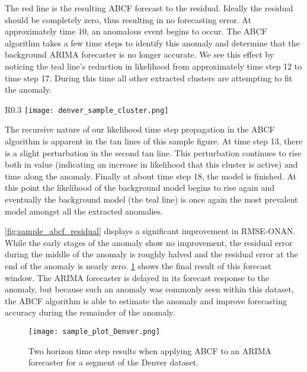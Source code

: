 The red line is the resulting ABCF forecast to the residual.  Ideally the residual should be completely zero, thus resulting in no forecasting error.  At approximately time 10, an anomalous event begins to occur.  The ABCF algorithm takes a few time steps to identify this anomaly and determine that the background ARIMA forecaster is no longer accurate.  We see this effect by noticing the teal line's reduction in likelihood from approximately time step 12 to time step 17.  During this time all other extracted clusters are attempting to fit the anomaly.

\begin{wrapfigure}{R}{0.3\textwidth}
\centering
\texttt{[image: denver\_sample\_cluster.png]}
\caption{Extracted sample clustered anomaly.}
\label{fig:sample_cluster}
\end{wrapfigure}

The recursive nature of our likelihood time step propagation in the ABCF algorithm is apparent in the tan lines of this sample figure.  At time step 13, there is a slight perturbation in the second tan line.  This perturbation continues to rise both in value (indicating an increase in likelihood that this cluster is active) and time along the anomaly.  Finally at about time step 18, the model is finished.  At this point the likelihood of the background model begins to rise again and eventually the background model (the teal line) is once again the most prevalent model amongst all the extracted anomalies.

\ref{fig:sample_abcf_residual} displays a significant improvement in RMSE-ONAN.  While the early stages of the anomaly show no improvement, the residual error during the middle of the anomaly is roughly halved and the residual error at the end of the anomaly is nearly zero.  \ref{fig:sample_abcf_denver} shows the final result of this forecast window.  The ARIMA forecaster is delayed in its forecast response to the anomaly, but because such an anomaly was commonly seen within this dataset, the ABCF algorithm is able to estimate the anomaly and improve forecasting accuracy during the remainder of the anomaly.

\begin{figure}[!h]
	\begin{center}
		\texttt{[image: sample\_plot\_Denver.png]}
	\end{center}
	\caption{Two horizon time step results when applying ABCF to an ARIMA forecaster for a segment of the Denver dataset.}
	\label{fig:sample_abcf_denver}
\end{figure}



